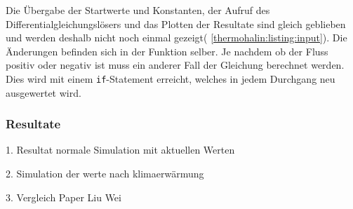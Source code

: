 Die Übergabe der Startwerte und Konstanten, der Aufruf des Differentialgleichungslösers und das Plotten der Resultate sind gleich geblieben und werden deshalb nicht noch einmal gezeigt( \ref{thermohalin:listing:input}). Die Änderungen befinden sich in der Funktion selber. Je nachdem ob der Fluss positiv oder negativ ist muss ein anderer Fall der Gleichung berechnet werden. Dies wird mit einem \texttt{if}-Statement erreicht, welches in jedem Durchgang neu ausgewertet wird.








\subsubsection{Resultate} 

1. Resultat normale Simulation mit aktuellen Werten

2. Simulation der werte nach klimaerwärmung

3. Vergleich Paper Liu Wei


